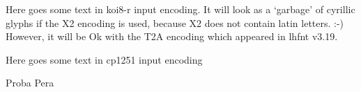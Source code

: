 \documentclass{article}
\begin{document}
Here goes some text in koi8-r input encoding.
It will look as a `garbage' of cyrillic glyphs if the X2 encoding is used,
because X2 does not contain latin letters. :-)
However, it will be Ok with the T2A encoding which appeared in lhfnt v3.19.





Here goes some text in cp1251 input encoding


\selectfont

Proba Pera
\end{document}

